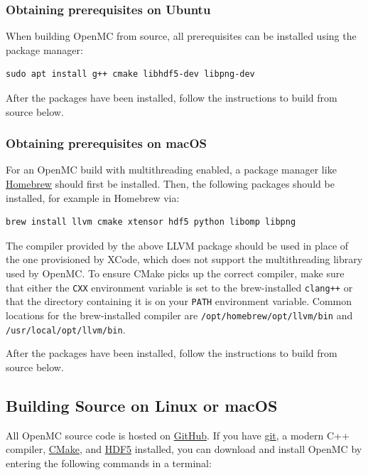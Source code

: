 \subsubsection*{Obtaining prerequisites on Ubuntu}

When building OpenMC from source, all prerequisites can
be installed using the package manager:

\begin{verbatim}
sudo apt install g++ cmake libhdf5-dev libpng-dev
\end{verbatim}

After the packages have been installed, follow the instructions to build from source below.

\subsubsection*{Obtaining prerequisites on macOS}

For an OpenMC build with multithreading enabled, a package manager like
\href{https://brew.sh}{Homebrew} should first be installed. Then, the following
packages should be installed, for example in Homebrew via:

\begin{verbatim}
brew install llvm cmake xtensor hdf5 python libomp libpng
\end{verbatim}

The compiler provided by the above LLVM package should be used in place of the
one provisioned by XCode, which does not support the multithreading library used
by OpenMC. To ensure CMake picks up the correct compiler, make sure that either
the \texttt{CXX} environment variable is set to the brew-installed \texttt{clang++}
or that the directory containing it is on your \texttt{PATH} environment
variable. Common locations for the brew-installed compiler are
\texttt{/opt/homebrew/opt/llvm/bin} and \texttt{/usr/local/opt/llvm/bin}.

After the packages have been installed, follow the instructions to build from
source below.

\subsection*{Building Source on Linux or macOS}

All OpenMC source code is hosted on \href{https://github.com/openmc-dev/openmc}{GitHub}.
If you have \href{https://git-scm.com}{git}, a modern C++ compiler,
\href{https://cmake.org}{CMake}, and \href{https://www.hdfgroup.org/solutions/hdf5/}{HDF5}
installed, you can download and install OpenMC by entering the following commands
in a terminal:

